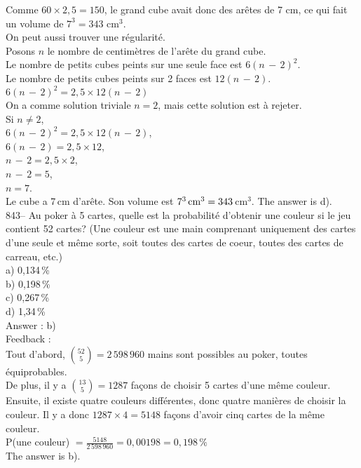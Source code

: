 ﻿\documentclass[letterpaper, 12pt]{article}
\begin{document}
Comme $60\times2,5=150$, le grand cube avait donc des ar\^etes de 7
cm, ce qui fait un volume de $7^3 = 343$ cm${^3}$.\\

On peut aussi trouver une r\'egularit\'e.\\
Posons $n$ le nombre de centim\`etres de l'ar\^ete du grand cube.\\
Le nombre de petits cubes peints sur une seule face est $6\left(
n\,-\,2\right) ^{2}$.\\
Le nombre de petits cubes peints sur 2 faces est $12\left( n\,-\,2\right)
$.\\

$6\left( n\,-\,2\right) ^{2}=2,5\times12\left( n\,-\,2\right) $\\
On a comme solution triviale $n=2$, mais cette solution est \`a rejeter.\\

Si $n\neq2$,\\
$6\left( n\,-\,2\right) ^{2}=2,5\times12\left( n\,-\,2\right) $,\\
$6\left( n\,-\,2\right)=2,5\times12 $,\\
$ n\,-\,2=2,5\times2 $,\\
$ n\,-\,2=5 $,\\
$ n=7 $.\\
Le cube a 7\,cm d'ar\^ete.  Son volume est
$7^3\textrm{\,cm}^{3}=343$\,cm$^{3}$.  The answer is d).\\

843-- Au poker \`a 5 cartes, quelle est la probabilit\'e d'obtenir une
couleur si le jeu contient 52 cartes? (Une couleur est une main comprenant
uniquement des cartes d'une seule et m\^eme sorte, soit toutes des cartes de
coeur, toutes des cartes de carreau, etc.) \\
a) 0,134\,\%\\
b) 0,198\,\%\\
c) 0,267\,\%\\
d) 1,34\,\%\\

Answer : b)\\

Feedback : \\
Tout d'abord, $\binom{52}{5}=2\,598\,960$ mains sont possibles au poker,
toutes \'equiprobables.  \\[2mm]
De plus, il y a $\binom{13}{5}=1287$ fa\c cons de choisir 5 cartes d'une
m\^eme couleur.  Ensuite, il existe quatre couleurs diff\'erentes, donc
quatre mani\`eres de choisir la couleur.  Il y a donc $1287\times4=5148$
fa\c cons d'avoir cinq cartes de la m\^eme couleur.  \\[2mm]
P(une couleur) $=\frac{5148}{2\,598\,960}=0,00198=0,198\,\%$\\[2mm]
The answer is b).\\
\end{document}
